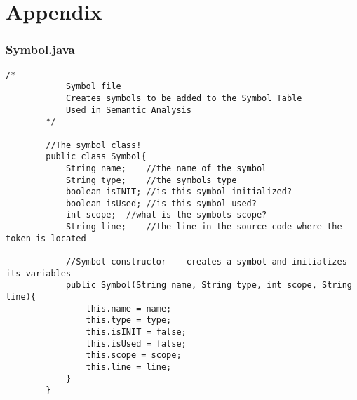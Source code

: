 \documentclass[letterpaper, 10pt,DIV=13]{scrartcl}
\numberwithin{equation}{section} %
\numberwithin{figure}{section} %
\numberwithin{table}{section} %
\begin{document}
\pagebreak


\section{Appendix}

\subsubsection*{Symbol.java}
    \lstset{numbers=left, numberstyle=\tiny, stepnumber=1, numbersep=5pt, basicstyle=\footnotesize\ttfamily}
    \begin{lstlisting}[frame=single, ]
        /*
            Symbol file
            Creates symbols to be added to the Symbol Table
            Used in Semantic Analysis
        */
        
        //The symbol class!
        public class Symbol{
            String name;    //the name of the symbol
            String type;    //the symbols type
            boolean isINIT; //is this symbol initialized?
            boolean isUsed; //is this symbol used?
            int scope;  //what is the symbols scope?
            String line;    //the line in the source code where the token is located
            
            //Symbol constructor -- creates a symbol and initializes its variables
            public Symbol(String name, String type, int scope, String line){
                this.name = name;
                this.type = type;
                this.isINIT = false;
                this.isUsed = false;
                this.scope = scope;
                this.line = line;
            }
        }
    \end{lstlisting}
    
\end{document}
